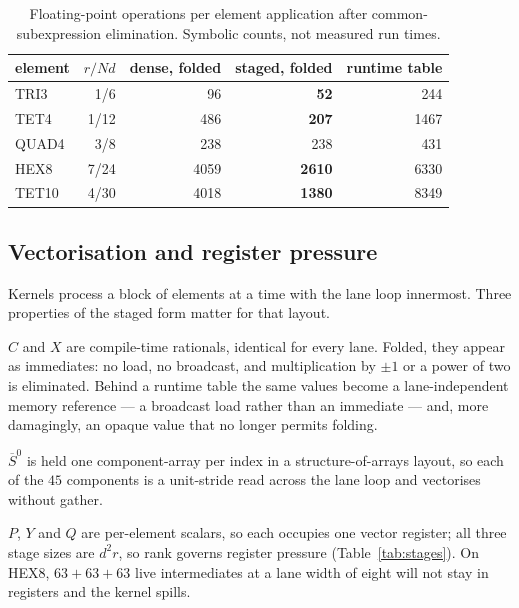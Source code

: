\documentclass[11pt]{article}
\newcommand{\Sbar}{\overline{S}}
\begin{document}
\begin{table}[ht]
\centering
\begin{tabular}{lrrrr}
\toprule
element & $r/Nd$ & dense, folded & staged, folded & runtime table \\
\midrule
TRI3  & 1/6  &   96 &  \textbf{52} &  244 \\
TET4  & 1/12 &  486 & \textbf{207} & 1467 \\
QUAD4 & 3/8  &  238 &          238 &  431 \\
HEX8  & 7/24 & 4059 & \textbf{2610} & 6330 \\
TET10 & 4/30 & 4018 & \textbf{1380} & 8349 \\
\bottomrule
\end{tabular}
\caption{Floating-point operations per element application after
common-subexpression elimination.  Symbolic counts, not measured run times.}
\label{tab:cost}
\end{table}

\subsection{Vectorisation and register pressure}

Kernels process a block of elements at a time with the lane loop innermost.
Three properties of the staged form matter for that layout.

\begin{description}[leftmargin=1.5em]
\item[The reference tensor is lane-invariant.]  $C$ and $X$ are compile-time
  rationals, identical for every lane.  Folded, they appear as immediates: no
  load, no broadcast, and multiplication by $\pm1$ or a power of two is
  eliminated.  Behind a runtime table the same values become a lane-independent
  memory reference --- a broadcast load rather than an immediate --- and, more
  damagingly, an opaque value that no longer permits folding.
\item[The store is a unit-stride stream.]  $\Sbar^0$ is held one component-array
  per index in a structure-of-arrays layout, so each of the $45$ components is a
  unit-stride read across the lane loop and vectorises without gather.
\item[The intermediates are lane-width vectors.]  $P$, $Y$ and $Q$ are
  per-element scalars, so each occupies one vector register; all three stage
  sizes are $d^2 r$, so rank governs register pressure
  (Table~\ref{tab:stages}).  On HEX8, $63+63+63$ live intermediates at a lane
  width of eight will not stay in registers and the kernel spills.
\end{description}
\end{document}
